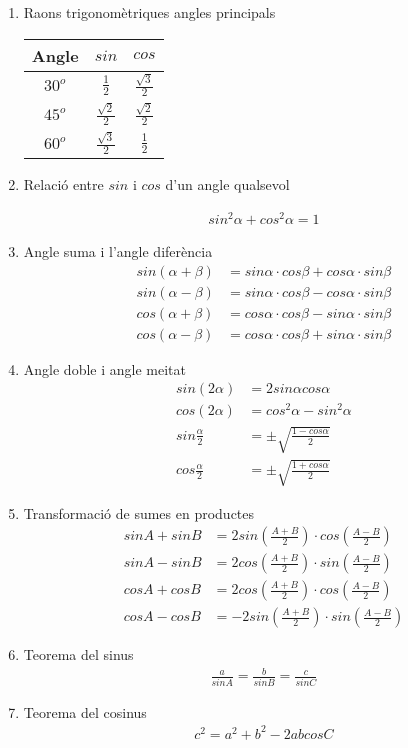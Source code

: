 \documentclass{article}
\begin{document}
	\author{Mireia Dosil}
	\date{text}

\begin{enumerate}
 
\item Raons trigonomètriques angles principals

\begin{tabular}{|c|c|c|}
	\hline Angle & $sin$ & $cos$  \\ 
	\hline  $30^o$& $\frac{1}{2}$ & $\frac{\sqrt{3}}{2}$ \\ 
	\hline  $45^o$& $\frac{\sqrt{2}}{2}$ & $\frac{\sqrt{2}}{2}$ \\ 
	\hline  $60^o$& $\frac{\sqrt{3}}{2}$  & $\frac{1}{2}$ \\ 
	\hline 
\end{tabular} 
\item Relació entre $sin$ i $cos$ d'un angle qualsevol

\begin{align}
sin^2 \alpha+cos ^2 \alpha=1
\end{align}

\item Angle suma i l'angle diferència
\begin{align}
sin(\alpha + \beta)&=sin \alpha \cdot cos \beta + cos \alpha \cdot sin \beta \\
sin(\alpha - \beta)&=sin \alpha \cdot cos \beta - cos \alpha \cdot sin \beta \\
cos(\alpha + \beta)&=cos \alpha \cdot cos \beta - sin \alpha \cdot sin \beta \\
cos(\alpha - \beta)&=cos \alpha \cdot cos \beta + sin \alpha \cdot sin \beta
\end{align}

\item Angle doble i angle meitat
\begin{align}
sin (2\alpha)&=2sin \alpha cos \alpha \\
cos(2\alpha)&=cos^2 \alpha - sin ^2 \alpha \\
sin \frac{\alpha}{2}&=\pm \sqrt{\frac{1-cos \alpha}{2}} \\
cos \frac{\alpha}{2}&=\pm \sqrt{\frac{1+cos \alpha}{2}}
\end{align}

\item Transformació de sumes en productes
\begin{align}
sin A + sin B &=2 sin (\frac{A+B}{2}) \cdot cos (\frac{A-B}{2}) \\
sin A - sin B &=2 cos (\frac{A+B}{2}) \cdot sin (\frac{A-B}{2}) \\
cos A + cos B &=2 cos (\frac{A+B}{2}) \cdot cos (\frac{A-B}{2}) \\
cos A - cos B &=-2 sin (\frac{A+B}{2}) \cdot sin (\frac{A-B}{2}) 
\end{align}

\item Teorema del sinus
\begin{align}
\frac{a}{sinA}=\frac{b}{sinB}=\frac{c}{sinC}
\end{align}

\item Teorema del cosinus
\begin{align}
c^2=a^2+b^2-2ab cos C
\end{align}

\end{enumerate}
 
\end{document}

